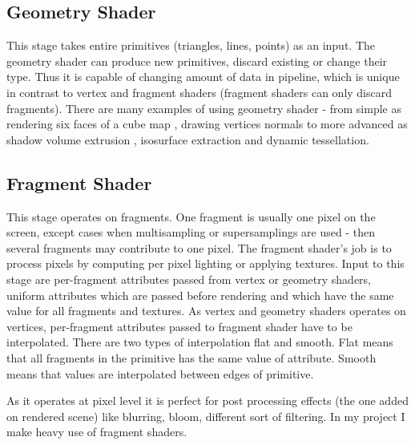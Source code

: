 \subsection{Geometry Shader}
This stage takes entire primitives (triangles, lines, points) as an input. The geometry shader can produce new primitives, discard existing or change their type. Thus it is capable of changing amount of data in pipeline, which is unique in contrast to vertex and fragment shaders (fragment shaders can only discard fragments). There are many examples of using geometry shader - from simple as rendering six faces of a cube map \cite{Gregory2009}, drawing vertices normals \cite[pages~434-437]{OpenGLSuperbible} to more advanced as shadow volume extrusion \cite[section~10.3.3.1]{Gregory2009}, isosurface extraction \cite{3DCourseSIGGraph2007} and dynamic tessellation. 

\subsection{Fragment Shader}
This stage operates on fragments. One fragment is usually one pixel on the screen, except cases when multisampling or supersamplings are used - then several fragments may contribute to one pixel. The fragment shader's job is to process pixels by computing per pixel lighting or applying textures. Input to this stage are per-fragment attributes passed from vertex or geometry shaders, uniform attributes which are passed before rendering and which have the same value for all fragments and textures. As vertex and geometry shaders operates on vertices, per-fragment attributes passed to fragment shader have to be interpolated. There are two types of interpolation flat and smooth. Flat means that all fragments in the primitive has the same value of attribute. Smooth means that values are interpolated between edges of primitive. 

As it operates at pixel level it is perfect for post processing effects (the one added on rendered scene) like blurring, bloom, different sort of filtering. In my project I make heavy use of fragment shaders. 

